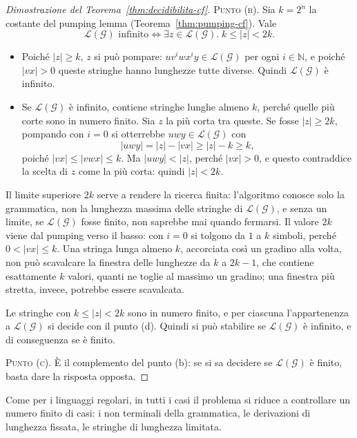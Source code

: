 \documentclass[a4paper, 11pt, oneside]{book}
\theoremstyle{formale}
\begin{document}
\begin{proof}[Dimostrazione del Teorema~\ref{thm:decidibilita-cf}]
        \textsc{Punto (b)}. Sia $k = 2^n$ la costante del pumping lemma
        (Teorema~\ref{thm:pumping-cf}). Vale
        \begin{equation*}
            \mathcal{L}(\mathcal{G}) \text{ infinito} \iff
            \exists z \in \mathcal{L}(\mathcal{G}).\; k \leq |z| < 2k.
        \end{equation*}
        \begin{itemize}
            \item[($\Leftarrow$)] Poich\'e $|z| \geq k$, $z$ si pu\`o pompare:
                $uv^i w x^i y \in \mathcal{L}(\mathcal{G})$ per ogni $i \in \mathbb{N}$, e
                poich\'e $|vx| > 0$ queste stringhe hanno lunghezze tutte diverse.
                Quindi $\mathcal{L}(\mathcal{G})$ \`e infinito.
            \item[($\Rightarrow$)] Se $\mathcal{L}(\mathcal{G})$ \`e infinito, contiene
                stringhe lunghe almeno $k$, perch\'e quelle pi\`u corte sono in numero
                finito. Sia $z$ la pi\`u corta tra queste. Se fosse $|z| \geq 2k$,
                pompando con $i = 0$ si otterrebbe $uwy \in \mathcal{L}(\mathcal{G})$ con
                \begin{equation*}
                    |uwy| = |z| - |vx| \geq |z| - k \geq k,
                \end{equation*}
                poich\'e $|vx| \leq |vwx| \leq k$. Ma $|uwy| < |z|$, perch\'e $|vx| > 0$,
                e questo contraddice la scelta di $z$ come la pi\`u corta: quindi
                $|z| < 2k$.
        \end{itemize}
        Il limite superiore $2k$ serve a rendere la ricerca finita: l'algoritmo conosce
        solo la grammatica, non la lunghezza massima delle stringhe di
        $\mathcal{L}(\mathcal{G})$, e senza un limite, se $\mathcal{L}(\mathcal{G})$ fosse
        finito, non saprebbe mai quando fermarsi. Il valore $2k$ viene dal pumping verso il
        basso: con $i = 0$ si tolgono da $1$ a $k$ simboli, perch\'e $0 < |vx| \leq k$.
        Una stringa lunga almeno $k$, accorciata cos\`i un gradino alla volta, non pu\`o
        scavalcare la finestra delle lunghezze da $k$ a $2k - 1$, che contiene esattamente
        $k$ valori, quanti ne toglie al massimo un gradino; una finestra pi\`u stretta,
        invece, potrebbe essere scavalcata.

        Le stringhe con $k \leq |z| < 2k$ sono in numero finito, e per ciascuna
        l'appartenenza a $\mathcal{L}(\mathcal{G})$ si decide con il punto (d). Quindi si
        pu\`o stabilire se $\mathcal{L}(\mathcal{G})$ \`e infinito, e di conseguenza se
        \`e finito.

        \textsc{Punto (c)}. \`E il complemento del punto (b): se si sa decidere se
        $\mathcal{L}(\mathcal{G})$ \`e finito, basta dare la risposta opposta.
    \end{proof}
    Come per i linguaggi regolari, in tutti i casi il problema si riduce a controllare un
    numero finito di casi: i non terminali della grammatica, le derivazioni di lunghezza
    fissata, le stringhe di lunghezza limitata.
\end{document}
